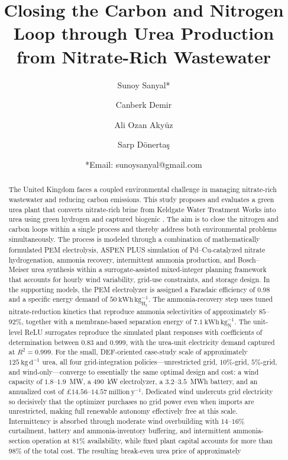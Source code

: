 \documentclass[letterpaper]{article}
\author[1,2]{Sunoy Sanyal*}
\author[1,3]{Canberk Demir}
\author[1]{Ali Ozan Aky\"uz}
\author[1]{Sarp D\"onerta\c{s}}
\affil[1]{Department of Chemical and Biological Engineering, Ko\c{c} University, Istanbul, T\"urkiye}
\affil[2]{Department of Industrial Engineering, Ko\c{c} University, Istanbul, T\"urkiye}
\affil[3]{Department of Chemistry, Ko\c{c} University, Istanbul, T\"urkiye}
\title{Closing the Carbon and Nitrogen Loop through Urea Production
  from Nitrate-Rich Wastewater}
\date{*Email: sunoysanyal@gmail.com}
\begin{document}
\maketitle

\begin{abstract}
The United Kingdom faces a coupled environmental challenge in managing
nitrate-rich wastewater and reducing carbon emissions. This study
proposes and evaluates a green urea plant that converts nitrate-rich
brine from Keldgate Water Treatment Works into urea using green
hydrogen and captured biogenic . The aim is to close the
nitrogen and carbon loops within a single process and thereby address
both environmental problems simultaneously. The process is modeled
through a combination of mathematically formulated PEM electrolysis,
ASPEN PLUS\textsuperscript{\textregistered} simulation of
Pd--Cu-catalyzed nitrate hydrogenation, ammonia recovery, intermittent
ammonia production, and Bosch--Meiser urea synthesis within a
surrogate-assisted mixed-integer planning framework that accounts for
hourly wind variability, grid-use constraints, and storage design. In
the supporting models, the PEM electrolyzer is assigned a Faradaic
efficiency of $0.98$ and a specific energy demand of
$50~\mathrm{kWh\,kg^{-1}_{H_2}}$. The ammonia-recovery step uses tuned
nitrate-reduction kinetics that reproduce ammonia selectivities of
approximately $85$--$92\%$, together with a membrane-based separation
energy of $7.1~\mathrm{kWh\,kg^{-1}_{N}}$. The unit-level ReLU
surrogates reproduce the simulated plant responses with coefficients
of determination between $0.83$ and $0.999$, with the urea-unit
electricity demand captured at $R^2 = 0.999$. For the small,
DEF-oriented case-study scale of approximately
$125~\mathrm{kg\,d^{-1}}$ urea, all four grid-integration
policies---unrestricted grid, $10\%$-grid, $5\%$-grid, and
wind-only---converge to essentially the same optimal design and
cost: a wind capacity of $1.8$--$1.9$~MW, a $490$~kW electrolyzer, a
$3.2$--$3.5$~MWh battery, and an annualized cost of
\pounds$14.56$--$14.57~\mathrm{million\,y^{-1}}$. Dedicated wind
undercuts grid electricity so decisively that the optimizer purchases
no grid power even when imports are unrestricted, making full
renewable autonomy effectively free at this scale. Intermittency is
absorbed through moderate wind overbuilding with $14$--$16\%$
curtailment, battery and ammonia-inventory buffering, and
intermittent ammonia-section operation at $81\%$ availability, while
fixed plant capital accounts for more than $98\%$ of the total cost.
The resulting break-even urea price of approximately

\end{abstract}
\end{document}
